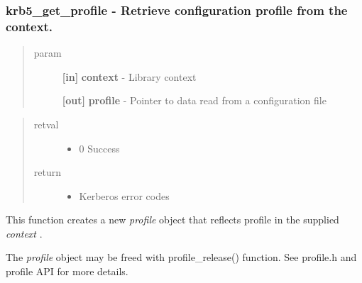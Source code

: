 \documentclass[letterpaper,10pt,english]{sphinxmanual}
\begin{document}
\subsubsection{krb5\_get\_profile -  Retrieve configuration profile from the context.}
\label{appdev/refs/api/krb5_get_profile::doc}\label{appdev/refs/api/krb5_get_profile:krb5-get-profile-retrieve-configuration-profile-from-the-context}

\begin{fulllineitems}
\label{appdev/refs/api/krb5_get_profile:krb5_get_profile}
\end{fulllineitems}

\begin{quote}\begin{description}
\item[{param}] \leavevmode
\textbf{{[}in{]}} \textbf{context} - Library context

\textbf{{[}out{]}} \textbf{profile} - Pointer to data read from a configuration file

\end{description}\end{quote}
\begin{quote}\begin{description}
\item[{retval}] \leavevmode\begin{itemize}
\item {} 
0   Success

\end{itemize}

\item[{return}] \leavevmode\begin{itemize}
\item {} 
Kerberos error codes

\end{itemize}

\end{description}\end{quote}

This function creates a new \emph{profile} object that reflects profile in the supplied \emph{context} .

The \emph{profile} object may be freed with profile\_release() function. See profile.h and profile API for more details.
\end{document}
